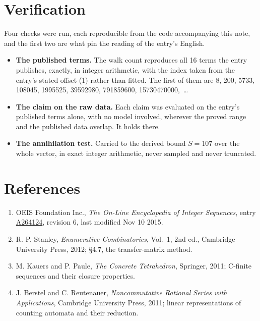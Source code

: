 \documentclass[11pt]{article}
\theoremstyle{definition}
\begin{document}
\section{Verification}

Four checks were run, each reproducible from the code accompanying this note, and the first two are what pin the reading of the entry's English.

\begin{itemize}

\item {\bfseries The published terms.} The walk count reproduces all 16 terms the entry publishes, exactly, in integer arithmetic, with the index taken from the entry's stated offset (1) rather than fitted. The first of them are 8, 200, 5733, 108045, 1995525, 39592980, 791859600, 15730470000,~\dots

\item {\bfseries The claim on the raw data.} Each claim was evaluated on the entry's published terms alone, with no model involved, wherever the proved range and the published data overlap. It holds there.

\item {\bfseries The annihilation test.} Carried to the derived bound $S = 107$ over the whole vector, in exact integer arithmetic, never sampled and never truncated.

\end{itemize}

\section{References}

\begin{enumerate}

\item OEIS Foundation Inc., \emph{The On-Line Encyclopedia of Integer Sequences}, entry \href{https://oeis.org/A264124}{A264124}, revision 6, last modified Nov 10 2015.

\item R. P. Stanley, \emph{Enumerative Combinatorics}, Vol.~1, 2nd ed., Cambridge University Press, 2012; \S4.7, the transfer-matrix method.

\item M. Kauers and P. Paule, \emph{The Concrete Tetrahedron}, Springer, 2011; C-finite sequences and their closure properties.

\item J. Berstel and C. Reutenauer, \emph{Noncommutative Rational Series with Applications}, Cambridge University Press, 2011; linear representations of counting automata and their reduction.

\end{enumerate}
\end{document}
